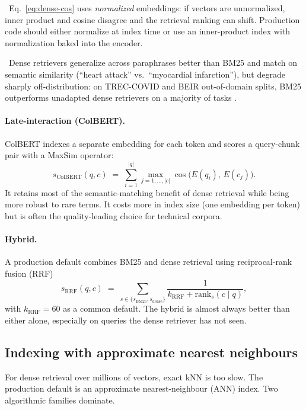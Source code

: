\Assum\ Eq.~\eqref{eq:dense-cos} uses \emph{normalized} embeddings:
if vectors are unnormalized, inner product and cosine disagree and
the retrieval ranking can shift. Production code should either
normalize at index time or use an inner-product index with
normalization baked into the encoder.

\Emp\ Dense retrievers generalize across paraphrases better than
BM25 and match on semantic similarity (``heart attack'' vs.\
``myocardial infarction''), but degrade sharply off-distribution:
on TREC-COVID and BEIR out-of-domain splits, BM25 outperforms
unadapted dense retrievers on a majority of tasks
\citep{thakur2021beir}.

\paragraph{Late-interaction (ColBERT).}
ColBERT \citep{khattab2020colbert} indexes a separate embedding for
each token and scores a query-chunk pair with a MaxSim operator:
\begin{equation}
  s_{\mathrm{ColBERT}}(q, c)
  \;=\; \sum_{i=1}^{|q|} \max_{j=1,\dots,|c|}
         \cos\!\bigl(E(q_i),\, E(c_j)\bigr).
  \label{eq:colbert-maxsim}
\end{equation}
It retains most of the semantic-matching benefit of dense retrieval
while being more robust to rare terms. It costs more in index size
(one embedding per token) but is often the quality-leading choice
for technical corpora.

\paragraph{Hybrid.}
A production default combines BM25 and dense retrieval using
reciprocal-rank fusion (RRF)
\begin{equation}
  s_{\mathrm{RRF}}(q, c)
  \;=\; \sum_{s \in \{s_{\mathrm{BM25}}, s_{\mathrm{dense}}\}}
         \frac{1}{k_\mathrm{RRF} + \mathrm{rank}_s(c \mid q)},
  \label{eq:rrf}
\end{equation}
with $k_\mathrm{RRF}=60$ as a common default. The hybrid is almost
always better than either alone, especially on queries the dense
retriever has not seen.

\subsection{Indexing with approximate nearest neighbours}

For dense retrieval over millions of vectors, exact kNN is too
slow. The production default is an approximate nearest-neighbour
(ANN) index. Two algorithmic families dominate.

